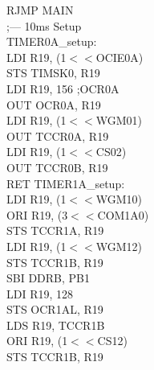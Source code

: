 \documentclass[titlepage, a4paper, 10pt, reqno, openany]{report}
\begin{document}
\begin{minipage}[t]{.45\linewidth}
	\hspace*{.5cm}	RJMP MAIN \\
	\newline
	;--- 10ms Setup \\
	TIMER0A\_setup: \\
	\hspace*{.5cm}	LDI R19, (1$<<$OCIE0A) \\
	\hspace*{.5cm}	STS TIMSK0, R19 \\
	\hspace*{.5cm}	LDI R19, 156 ;OCR0A \\
	\hspace*{.5cm}	OUT OCR0A, R19 \\
	\hspace*{.5cm}	LDI R19, (1$<<$WGM01) \\
	\hspace*{.5cm}	OUT TCCR0A, R19 \\
	\hspace*{.5cm}	LDI R19, (1$<<$CS02) \\
	\hspace*{.5cm}	OUT TCCR0B, R19 \\
	\hspace*{.5cm}	RET
	\newline
	TIMER1A\_setup: \\
	\hspace*{.5cm}	LDI R19, (1$<<$WGM10) \\
	\hspace*{.5cm}	ORI R19, (3$<<$COM1A0) \\
	\hspace*{.5cm}	STS TCCR1A, R19 \\
	\hspace*{.5cm}	LDI R19, (1$<<$WGM12) \\
	\hspace*{.5cm}	STS TCCR1B, R19 \\
	\hspace*{.5cm}	SBI DDRB, PB1 \\
	\hspace*{.5cm}	LDI R19, 128 \\
	\hspace*{.5cm}	STS OCR1AL, R19 \\
	\hspace*{.5cm}	LDS R19, TCCR1B \\
	\hspace*{.5cm}	ORI R19, (1$<<$CS12) \\
	\hspace*{.5cm}	STS TCCR1B, R19 \\

\end{minipage}
\end{document}
